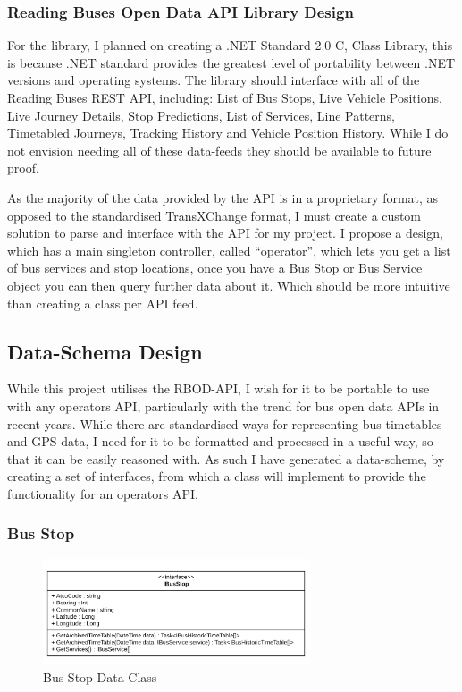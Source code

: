 \documentclass{article}
\newcommand{\CS}{C\nolinebreak\hspace{-.05em}\raisebox{.6ex}{\tiny\bf \#}}
\begin{document}
\subsubsection{Reading Buses Open Data API Library Design}
For the library, I planned on creating a .NET Standard 2.0 \CS, Class Library, this is because .NET standard provides the greatest level of portability between .NET versions and operating systems. The library should interface with all of the Reading Buses REST API, including: List of Bus Stops, Live Vehicle Positions, Live Journey Details, Stop Predictions, List of Services, Line Patterns, Timetabled Journeys, Tracking History and Vehicle Position History. While I do not envision needing all of these data-feeds they should be available to future proof. 


\par 
As the majority of the data provided by the API is in a proprietary format, as opposed to the standardised TransXChange format\cite{RN28}, I must create a custom solution to parse and interface with the API for my project. I propose a design, which has a main singleton controller, called ``operator'', which lets you get a list of bus services and stop locations, once you have a Bus Stop or Bus Service object you can then query further data about it. Which should be more intuitive than creating a class per API feed.

\subsection{Data-Schema Design}

\par
While this project utilises the RBOD-API, I wish for it to be portable to use with any operators API, particularly with the trend for bus open data APIs in recent years. While there are standardised ways for representing bus timetables and GPS data, I need for it to be formatted and processed in a useful way, so that it can be easily reasoned with. As such I have generated a data-scheme, by creating a set of interfaces, from which a class will implement to provide the functionality for an operators API.


\subsubsection{Bus Stop}

\begin{figure}[H]
	\centering
	\includegraphics[width=300px]{images/CD_Stop.png}
	\caption{Bus Stop Data Class}
	\label{fig:busstopdata}
\end{figure}
\end{document}
